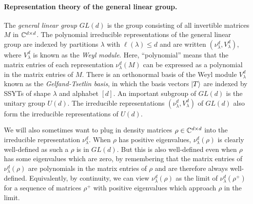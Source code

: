 \documentclass{article}
\begin{document}
\paragraph{Representation theory of the general linear group.}
The \emph{general linear group $GL(d)$} is the group consisting of all invertible matrices $M$ in $\mathbb C^{d \times d}$.
The polynomial irreducible representations of the general linear group are indexed by partitions $\lambda$ with $\ell(\lambda) \leq d$ and are written $(\nu^d_{\lambda}, V^d_{\lambda})$, where $V^d_{\lambda}$ is known as the \emph{Weyl module}.
Here, ``polynomial'' means that the matrix entries of each representation $\nu^d_{\lambda}(M)$ can be expressed as a polynomial in the matrix entries of $M$.
There is an orthonormal basis of the Weyl module $V_{\lambda}^d$ known as the \emph{Gelfand-Tsetlin basis}, in which the basis vectors $\ket{T}$ are indexed by SSYTs of shape $\lambda$ and alphabet $[d]$.
An important subgroup of $GL(d)$ is the unitary group $U(d)$.
The irreducible representations $(\nu^d_{\lambda}, V^d_{\lambda})$ of $GL(d)$ also form the irreducible representations of $U(d)$.

We will also sometimes want to plug in density matrices $\rho \in \mathbb C^{d \times d}$ into the irreducible representation $\nu^d_{\lambda}$. When $\rho$ has positive eigenvalues, $\nu^d_{\lambda}(\rho)$ is clearly well-defined as such a $\rho$ is in $GL(d)$.
But this is also well-defined even when $\rho$ has some eigenvalues which are zero, by remembering that the matrix entries of $\nu^d_{\lambda}(\rho)$ are polynomials in the matrix entries of $\rho$ and are therefore always well-defined.
Equivalently, by continuity, we can view $\nu^d_{\lambda}(\rho)$ as the limit of $\nu^d_{\lambda}(\rho^+)$ for a sequence of matrices $\rho^+$ with positive eigenvalues which approach $\rho$ in the limit.
\end{document}
